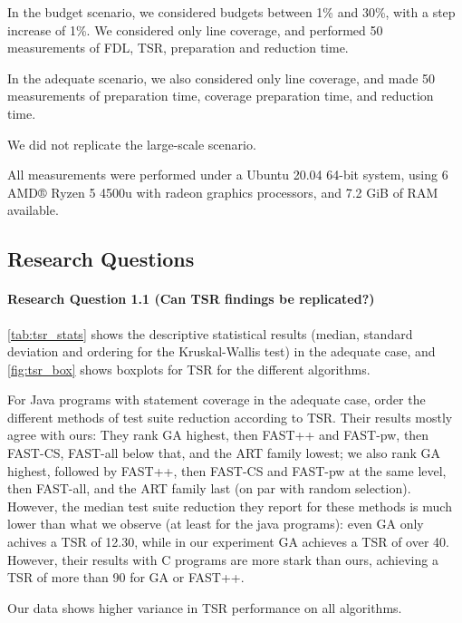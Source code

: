 
In the budget scenario, we considered budgets between 1\% and 30\%, with
a step increase of 1\%. We considered only line coverage, and performed
50 measurements of FDL, TSR, preparation and reduction time.

In the adequate scenario, we also considered only line coverage, and
made 50 measurements of preparation time, coverage preparation time,
and reduction time.

We did not replicate the large-scale scenario.

All measurements were performed under a Ubuntu 20.04 64-bit system,
using 6 AMD® Ryzen 5 4500u with radeon graphics processors, and 7.2
GiB of RAM available.

\subsection{Research Questions}

\paragraph{Research Question 1.1 (Can TSR findings be replicated?)}

\autoref{tab:tsr_stats} shows the descriptive statistical results
(median, standard deviation and ordering for the Kruskal-Wallis test)
in the adequate case, and \autoref{fig:tsr_box} shows boxplots for
TSR for the different algorithms.

For Java programs with statement coverage in the adequate case,
\cite{cruciani2019scalable} order the different methods of test suite
reduction according to TSR. Their results mostly agree with ours: They
rank GA highest, then FAST++ and FAST-pw, then FAST-CS, FAST-all below
that, and the ART family lowest; we also rank GA highest, followed by
FAST++, then FAST-CS and FAST-pw at the same level, then FAST-all, and
the ART family last (on par with random selection). However, the median
test suite reduction they report for these methods is much lower than what
we observe (at least for the java programs): even GA only achives a TSR
of 12.30, while in our experiment GA achieves a TSR of over 40. However,
their results with C programs are more stark than ours, achieving a TSR
of more than 90 for GA or FAST++.


Our data shows higher variance in TSR performance on all algorithms.

